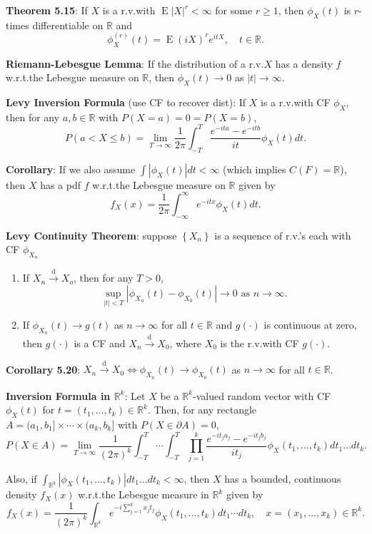 \documentclass[paper=letter,fontsize=3mm]{scrartcl}
\DeclareMathOperator{\E}{E}
\newcommand{\convdist}{\stackrel{\text{d}}{\longrightarrow}}
\newcommand{\R}{\mathbb{R}}
\newcommand\abs[1]{\left| #1 \right|}
\newcommand\set[1]{\left\{ #1 \right\}}
\begin{document}
\begin{multicols*}{3}
\textbf{Theorem 5.15}: If $X$ is a r.v.\@ with $\E \abs{X}^r < \infty$ for some $r \ge 1$, then $\phi_X(t)$ is $r$-times differentiable on $\R$ and
$$\phi^{(r)}_X(t) = \E (iX)^r e^{itX}, \quad t \in \R.$$

\textbf{Riemann-Lebesgue Lemma}: If the distribution of a r.v.\@ $X$ has a density $f$ w.r.t.\@ the Lebesgue measure on $\R$, then $\phi_X(t) \to 0$ as $\abs{t} \to \infty$. \\ \medskip

\textbf{Levy Inversion Formula} (use CF to recover dist): If $X$ is a r.v.\@ with CF $\phi_X$, then for any $a,b \in \R$ with $P(X = a) = 0 = P(X = b)$,
$$P(a < X \le b) = \lim_{T\to\infty} \frac{1}{2\pi} \int_{-T}^T \frac{e^{-ita} - e^{-itb}}{it}\phi_X(t)dt.$$

\textbf{Corollary}: If we also assume $\int \abs{\phi_X(t)}dt<\infty$ (which implies $C(F) = \R$), then $X$ has a pdf $f$ w.r.t.\@ the Lebesgue measure on $\R$ given by
$$f_X(x) = \frac{1}{2\pi} \int_{-\infty}^\infty e^{-itx}\phi_X(t)dt.$$

\textbf{Levy Continuity Theorem}: suppose $\set{X_n}$ is a sequence of r.v.'s each with CF $\phi_{X_n}$
\begin{enumerate}
\item If $X_n \convdist X_o$, then for any $T > 0$,
$$\sup_{\abs{t} < T} \abs{\phi_{X_n}(t) - \phi_{X_0}(t)} \to 0 \text{ as } n \to \infty.$$
\item If $\phi_{X_n}(t) \to g(t)$ as $n \to \infty$ for all $t \in \R$ and $g(\cdot)$ is continuous at zero, then $g(\cdot)$ is a CF and $X_n \convdist X_0$, where $X_0$ is the r.v.\@ with CF $g(\cdot)$.
\end{enumerate}

\textbf{Corollary 5.20}: $X_n \convdist X_0 \iff \phi_{X_n}(t) \to \phi_{X_0}(t)$ as $n \to \infty$ for all $t \in \R$. \\ \medskip

\textbf{Inversion Formula in $\R^k$}: Let $X$ be a $\R^k$-valued random vector with CF $\phi_X(t)$ for $t = (t_1, \dots, t_k) \in \R^k$. Then, for any rectangle $A = (a_1, b_1] \times \cdots \times (a_k, b_k]$ with $P(X \in \partial A) = 0$,
$$P(X \in A) = \lim_{T\to\infty} \frac{1}{(2\pi)^k} \int_{-T}^T \cdots \int_{-T}^T \prod_{j=1}^k
\frac{e^{-it_ja_j} - e^{-it_jb_j}}{it_j} \phi_X(t_1, \dots, t_k)dt_1\dots dt_k.$$

Also, if $\int_{\R^k} \abs{\phi_X(t_1,\dots,t_k)}dt_1\dots dt_k < \infty$, then $X$ has a bounded, continuous density $f_X(x)$ w.r.t.\@ the Lebesgue measure in $\R^k$ given by
$$f_X(x) = \frac{1}{(2\pi)^k} \int_{\R^k} e^{-i\sum_{j=1}^k x_jt_j}\phi_X(t_1, \dots, t_k)dt_1 \cdots dt_k, \quad x = (x_1, \dots, x_k) \in \R^k.$$


\end{multicols*}
\end{document}
